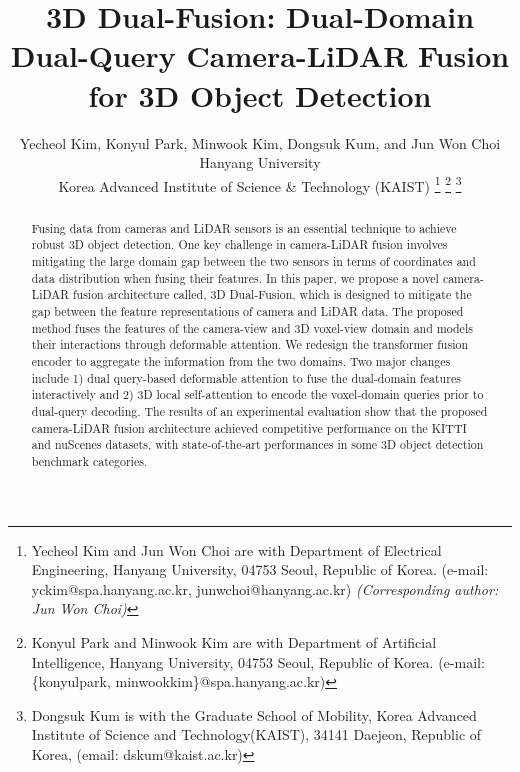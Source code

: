 \documentclass[lettersize,journal]{IEEEtran}
\begin{document}
\title{3D Dual-Fusion: Dual-Domain Dual-Query Camera-LiDAR Fusion for 3D Object Detection}

\author{Yecheol Kim, Konyul Park, Minwook Kim, Dongsuk Kum, and Jun Won Choi \\
Hanyang University \\ Korea Advanced Institute of Science \& Technology (KAIST)
\thanks{Yecheol Kim and Jun Won Choi are with Department of Electrical Engineering, Hanyang University, 04753 Seoul, Republic of Korea. (e-mail: yckim@spa.hanyang.ac.kr, junwchoi@hanyang.ac.kr) \textit{(Corresponding author: Jun Won Choi)}}
\thanks{Konyul Park and Minwook Kim are with Department of Artificial Intelligence, Hanyang University, 04753 Seoul, Republic of Korea. (e-mail: \{konyulpark, minwookkim\}@spa.hanyang.ac.kr)}
\thanks{Dongsuk Kum is with the Graduate School of Mobility, Korea Advanced Institute of Science and Technology(KAIST), 34141 Daejeon, Republic of Korea, (email: dskum@kaist.ac.kr)}}





\maketitle

\begin{abstract}
Fusing data from cameras and LiDAR sensors is an essential technique to achieve robust 3D object detection. One key challenge in camera-LiDAR fusion involves mitigating the large domain gap between the two sensors in terms of coordinates and data distribution when fusing their features. In this paper, we propose a novel camera-LiDAR fusion architecture called, 3D Dual-Fusion, which is designed to mitigate the gap between the feature representations of camera and LiDAR data. The proposed method fuses the features of the camera-view and 3D voxel-view domain and models their interactions through deformable attention. We redesign the transformer fusion encoder to aggregate the information from the two domains. Two major changes include 1) dual query-based deformable attention to fuse the dual-domain features interactively and 2) 3D local self-attention to encode the voxel-domain queries prior to dual-query decoding. The results of an experimental evaluation show that the proposed camera-LiDAR fusion architecture achieved competitive performance on the KITTI and nuScenes datasets, with state-of-the-art performances in some 3D object detection benchmark categories.
\end{abstract}
\end{document}

